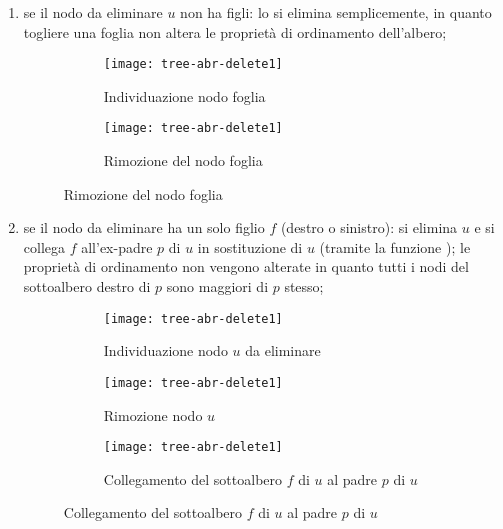 \clearpage
\begin{enumerate}[label={\footnotesize\ttfamily (\arabic*)}]
	\item se il nodo da eliminare \(u\) non ha figli: lo si elimina semplicemente, in quanto togliere una foglia non altera le proprietà di ordinamento dell'albero;

	\vspace{-8pt}

	\begin{figure}[H]\centering
		\hfill
		\begin{subfigure}[t]{.3\linewidth}
			\texttt{[image: tree-abr-delete1]}
			\caption{Individuazione nodo foglia}
		\end{subfigure}
		\hfill
		\begin{subfigure}[t]{.3\linewidth}
			\texttt{[image: tree-abr-delete1]}
			\caption{Rimozione del nodo foglia}
		\end{subfigure}
		\hfill\null
	\end{figure}

	\vspace{-17pt}

	\item se il nodo da eliminare ha un solo figlio \(f\) (destro o sinistro): si elimina \(u\) e si collega \(f\) all'ex-padre \(p\) di \(u\) in sostituzione di \(u\) (tramite la funzione \shortcut);
	le proprietà di ordinamento non vengono alterate in quanto tutti i nodi del sottoalbero destro di \(p\) sono maggiori di \(p\) stesso;

	\vspace{-8pt}

	\begin{figure}[H]
		\begin{subfigure}[t]{.3\linewidth}
			\texttt{[image: tree-abr-delete1]}
			\caption{Individuazione nodo \(u\) da eliminare}
		\end{subfigure}
		\hfill
		\begin{subfigure}[t]{.3\linewidth}
			\texttt{[image: tree-abr-delete1]}
			\caption{Rimozione nodo \(u\)}
		\end{subfigure}
		\hfill
		\begin{subfigure}[t]{.3\linewidth}
			\texttt{[image: tree-abr-delete1]}
			\caption{Collegamento del sottoalbero \(f\) di \(u\) al padre \(p\) di \(u\)}
		\end{subfigure}
	\end{figure}


\end{enumerate}
